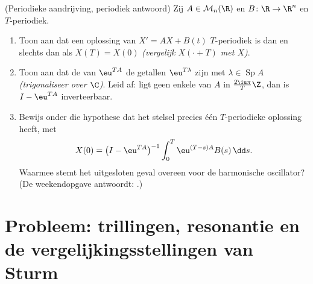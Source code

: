 \begin{exercise}[$\star\star\star$]\label{exo:b2:diffeq:12}
(Periodieke aandrijving, periodiek antwoord) Zij $A \in
\mathcal{M}_n(\R)$ en $B \colon \R \to \R^n$  en
$T$-periodiek.
\begin{enumerate}
  \item Toon aan dat een oplossing van $X' = AX + B(t)$
        $T$-periodiek is dan en slechts dan als $X(T) = X(0)$
        \emph{(vergelijk $X(\cdot + T)$ met $X$)}.
  \item Toon aan dat de  van $\eu^{TA}$ de getallen
        $\eu^{T\lambda}$ zijn met $\lambda \in
        \operatorname{Sp}A$ \emph{(trigonaliseer over $\C$)}. Leid
        af: ligt geen enkele  van $A$ in
        $\frac{2\iu\pi}{T}\Z$, dan is $I - \eu^{TA}$
        inverteerbaar.
  \item Bewijs onder die hypothese dat het stelsel precies één
        $T$-periodieke oplossing heeft, met
        \[
        X(0) = \bigl(I - \eu^{TA}\bigr)^{-1}
        \int_0^{T}\eu^{(T-s)A}B(s)\,\dd s .
        \]
        Waarmee stemt het uitgesloten geval overeen voor de
        harmonische oscillator? (De weekendopgave antwoordt:
        .)
\end{enumerate}
\end{exercise}

\section{Probleem: trillingen, resonantie en de
vergelijkingsstellingen van Sturm}

